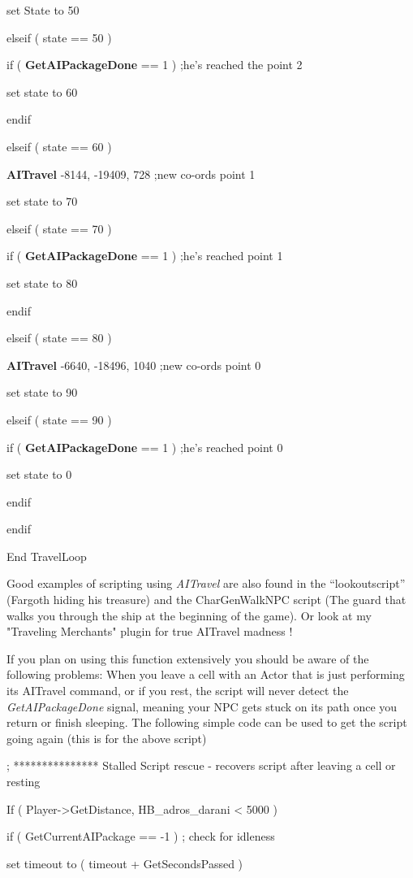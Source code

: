 \documentclass[
]{article}
\begin{document}
set State to 50

elseif ( state == 50 )

if ( \textbf{GetAIPackageDone} == 1 ) ;he's reached the point 2

set state to 60

endif

elseif ( state == 60 )

\textbf{AITravel} -8144, -19409, 728 ;new co-ords point 1

set state to 70

elseif ( state == 70 )

if ( \textbf{GetAIPackageDone} == 1 ) ;he's reached point 1

set state to 80

endif

elseif ( state == 80 )

\textbf{AITravel} -6640, -18496, 1040 ;new co-ords point 0

set state to 90

elseif ( state == 90 )

if ( \textbf{GetAIPackageDone} == 1 ) ;he's reached point 0

set state to 0

endif

endif

End TravelLoop

Good examples of scripting using \emph{AITravel} are also found in the
``lookoutscript'' (Fargoth hiding his treasure) and the CharGenWalkNPC
script (The guard that walks you through the ship at the beginning of
the game). Or look at my "Traveling Merchants" plugin for true AITravel
madness !

If you plan on using this function extensively you should be aware of
the following problems: When you leave a cell with an Actor that is just
performing its AITravel command, or if you rest, the script will never
detect the \emph{GetAIPackageDone} signal, meaning your NPC gets stuck
on its path once you return or finish sleeping. The following simple
code can be used to get the script going again (this is for the above
script)

; *************** Stalled Script rescue - recovers script after leaving
a cell or resting

If ( Player-\textgreater GetDistance, HB\_adros\_darani \textless{} 5000
)

if ( GetCurrentAIPackage == -1 ) ; check for idleness

set timeout to ( timeout + GetSecondsPassed )
\end{document}
